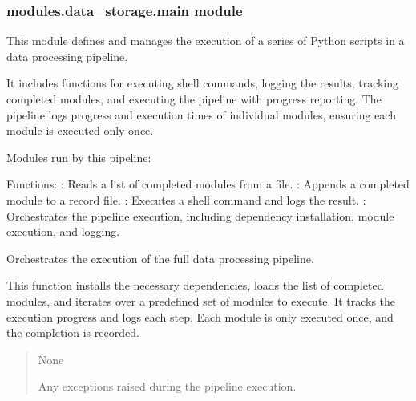 \documentclass[letterpaper,10pt,english]{sphinxmanual}
\begin{document}
\subsubsection{modules.data\_storage.main module}
\label{\detokenize{modules.data_storage:module-modules.data_storage.main}}\label{\detokenize{modules.data_storage:modules-data-storage-main-module}}
\sphinxAtStartPar
This module defines and manages the execution of a series of Python scripts in a data processing pipeline.

\sphinxAtStartPar
It includes functions for executing shell commands, logging the results, tracking completed modules,
and executing the pipeline with progress reporting. The pipeline logs progress and execution times
of individual modules, ensuring each module is executed only once.

\sphinxAtStartPar
Modules run by this pipeline:
\sphinxhyphen{} 
\sphinxhyphen{} 
\sphinxhyphen{} 
\sphinxhyphen{} 
\sphinxhyphen{} 
\sphinxhyphen{} 

\sphinxAtStartPar
Functions:
\sphinxhyphen{} : Reads a list of completed modules from a file.
\sphinxhyphen{} : Appends a completed module to a record file.
\sphinxhyphen{} : Executes a shell command and logs the result.
\sphinxhyphen{} : Orchestrates the pipeline execution, including dependency installation, module execution, and logging.

\begin{fulllineitems}
\label{\detokenize{modules.data_storage:modules.data_storage.main.main}}
\pysigstartsignatures
\pysiglinewithargsret
{}
{}
{}
\pysigstopsignatures
\sphinxAtStartPar
Orchestrates the execution of the full data processing pipeline.

\sphinxAtStartPar
This function installs the necessary dependencies, loads the list of completed modules,
and iterates over a predefined set of modules to execute. It tracks the execution progress
and logs each step. Each module is only executed once, and the completion is recorded.
\begin{quote}\begin{description}
\sphinxAtStartPar
None

\sphinxAtStartPar
Any exceptions raised during the pipeline execution.

\end{description}\end{quote}

\end{fulllineitems}
\end{document}
